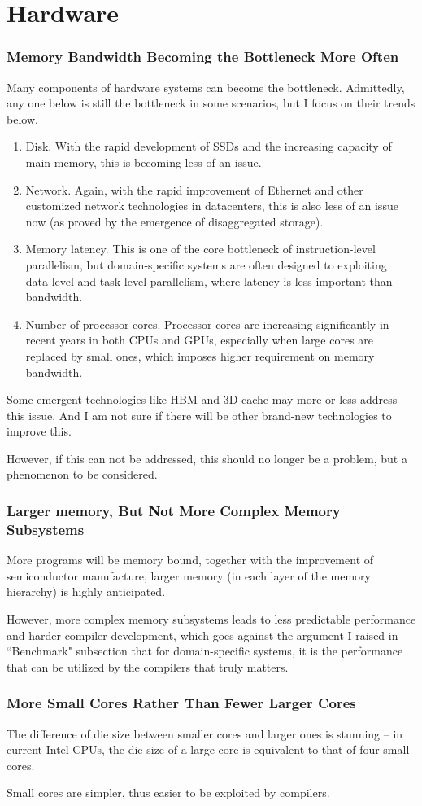 \documentclass[11pt]{article}
\begin{document}
\section{Hardware}
\subsubsection*{Memory Bandwidth Becoming the Bottleneck More Often}
Many components of hardware systems can become the bottleneck.
Admittedly, any one below is still the bottleneck in some scenarios, but I focus on their trends below.
\begin{enumerate}
    \item Disk.
    With the rapid development of SSDs and the increasing capacity of main memory, this is becoming less of an issue.
    \item Network.
    Again, with the rapid improvement of Ethernet and other customized network technologies in datacenters, this is also less of an issue now (as proved by the emergence of disaggregated storage).
    \item Memory latency.
    This is one of the core bottleneck of instruction-level parallelism, but domain-specific systems are often designed to exploiting data-level and task-level parallelism, where latency is less important than bandwidth.
    \item Number of processor cores.
    Processor cores are increasing significantly in recent years in both CPUs and GPUs, especially when large cores are replaced by small ones, which imposes higher requirement on memory bandwidth.
\end{enumerate}
Some emergent technologies like HBM and 3D cache may more or less address this issue.
And I am not sure if there will be other brand-new technologies to improve this.

However, if this can not be addressed, this should no longer be a problem, but a phenomenon to be considered.

\subsubsection*{Larger memory, But Not More Complex Memory Subsystems}
More programs will be memory bound, together with the improvement of semiconductor manufacture, larger memory (in each layer of the memory hierarchy) is highly anticipated.

However, more complex memory subsystems leads to less predictable performance and harder compiler development, which goes against the argument I raised in ``Benchmark" subsection that for domain-specific systems, it is the performance that can be utilized by the compilers that truly matters.

\subsubsection*{More Small Cores Rather Than Fewer Larger Cores}
The difference of die size between smaller cores and larger ones is stunning -- in current Intel CPUs, the die size of a large core is equivalent to that of four small cores.

Small cores are simpler, thus easier to be exploited by compilers.
\end{document}
